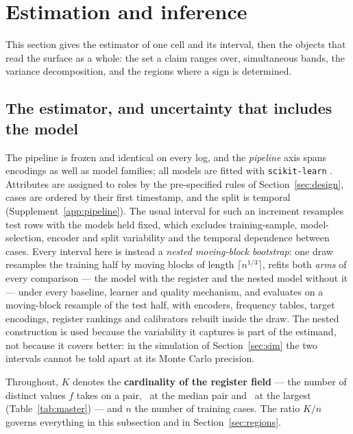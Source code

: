 \section{Estimation and inference}
\label{sec:inference}

This section gives the estimator of one cell and its interval, then the
objects that read the surface as a whole: the set a claim ranges over,
simultaneous bands, the variance decomposition, and the regions where a sign
is determined.

\subsection{The estimator, and uncertainty that includes the model}
\label{sec:boot}

The pipeline is frozen and identical on every log, and the \emph{pipeline}
axis spans encodings as well as model families; all models are fitted with
\texttt{scikit-learn} \citep{pedregosa2011scikit}. Attributes are assigned to roles by the
pre-specified rules of Section~\ref{sec:design}, cases are ordered by their
first timestamp, and the split is temporal (Supplement~\ref{app:pipeline}).
The usual interval for such an increment resamples test rows with the models
held fixed, which excludes training-sample, model-selection, encoder and
split variability and the temporal dependence between cases. Every interval
here is instead a \emph{nested moving-block bootstrap}: one draw resamples
the training half by moving blocks \citep{kunsch1989jackknife} of length
$\lceil n^{1/3} \rceil$, refits both \emph{arms} of every comparison --- the
model with the register and the nested model without it --- under every
baseline, learner and quality mechanism, and evaluates on a moving-block
resample of the test half, with encoders, frequency tables, target
encodings, register rankings and calibrators rebuilt inside the draw. The
nested construction is used because the variability it captures is part of
the estimand, not because it covers better: in the simulation of
Section~\ref{sec:sim} the two intervals cannot be told apart at its Monte
Carlo precision.

\noindent Throughout, $K$ denotes the \textbf{cardinality of the register
field} --- the number of distinct values $f$ takes on a pair, \cardFMedian\ at
the median pair and \cardFMax\ at the largest (Table~\ref{tab:master}) --- and
$n$ the number of training cases. The ratio $K/n$ governs everything in this
subsection and in Section~\ref{sec:regions}.

